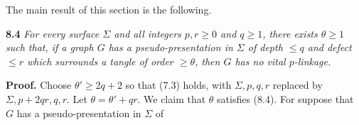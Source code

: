 The main result of this section is the following.

\textbf{8.4} \textit{For every surface $\Sigma$ and all integers $p, r \ge 0$ and $q \ge 1$, there exists $\theta \ge 1$ such that, if a graph $G$ has a pseudo-presentation in $\Sigma$ of depth $\le q$ and defect $\le r$ which surrounds a tangle of order $\ge \theta$, then $G$ has no vital $p$-linkage.}

\textbf{Proof.} Choose $\theta' \ge 2q + 2$ so that (7.3) holds, with $\Sigma, p, q, r$ replaced by $\Sigma, p + 2qr, q, r$. Let $\theta = \theta' + qr$. We claim that $\theta$ satisfies (8.4). For suppose that $G$ has a pseudo-presentation in $\Sigma$ of
